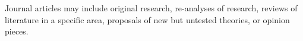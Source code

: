 Journal articles may include original research, re-analyses of research, reviews of literature in a specific area, proposals of new but untested theories, or opinion pieces.